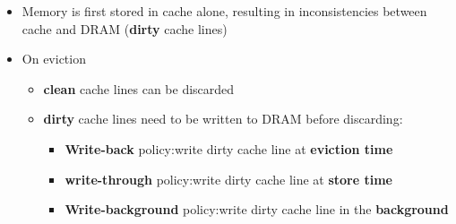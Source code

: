 \newpar{}
\begin{itemize}
    \item Memory is first stored in cache alone, resulting in inconsistencies between cache and DRAM (\textbf{dirty} cache lines)
    \item On eviction
          \begin{itemize}
              \item \textbf{clean} cache lines can be discarded
              \item \textbf{dirty} cache lines need to be written to DRAM before discarding:
                    \begin{itemize}
                        \item \textbf{Write-back} policy:\newline write dirty cache line at \textbf{eviction time}
                        \item \textbf{write-through} policy:\newline write dirty cache line at \textbf{store time}
                        \item \textbf{Write-background} policy:\newline write dirty cache line in the \textbf{background}
                    \end{itemize}
          \end{itemize}
\end{itemize}